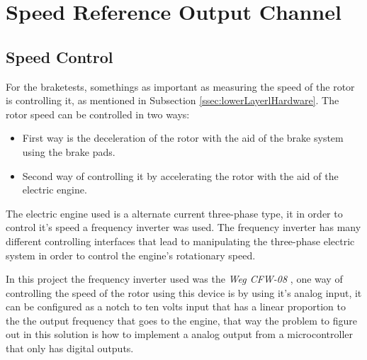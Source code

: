 \section{Speed Reference Output Channel}

	\subsection{Speed Control}
		\par
		For the braketests, somethings as important as measuring the speed of the rotor is controlling it, as mentioned in Subsection \ref{ssec:lowerLayerlHardware}. The rotor speed can be controlled in two ways:
			\begin{itemize}
				\item First way is the deceleration of the rotor with the aid of the brake system using the brake pads.
				\item Second way of controlling it by accelerating the rotor with the aid of the electric engine.
			\end{itemize}
		The electric engine used is a alternate current three-phase type, it in order to control it's speed a frequency inverter was used. The frequency inverter has many different controlling interfaces that lead to manipulating the three-phase electric system in order to control the engine's rotationary speed.
		\par
		In this project the frequency inverter used was the \textit{Weg CFW-08} \cite{wegCFW08Manual}, one way of controlling the speed of the rotor using this device is by using it's analog input, it can be configured as a notch to ten volts input that has a linear proportion to the the output frequency that goes to the engine, that way the problem to figure out in this solution is how to implement a analog output from a microcontroller that only has digital outputs.

